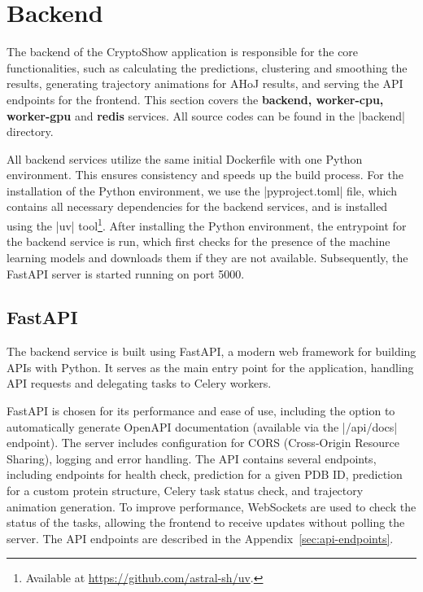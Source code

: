 \section{Backend}
\label{sec:backend}

The backend of the CryptoShow application is responsible for the core functionalities, such as calculating the predictions, clustering and smoothing the results, generating trajectory animations for AHoJ results, and serving the API endpoints for the frontend. This section covers the \textbf{backend, worker-cpu, worker-gpu} and \textbf{redis} services. All source codes can be found in the \inline|backend| directory.

All backend services utilize the same initial Dockerfile with one Python environment. This ensures consistency and speeds up the build process. For the installation of the Python environment, we use the \inline|pyproject.toml| file, which contains all necessary dependencies for the backend services, and is installed using the \inline|uv| tool\footnote{Available at \url{https://github.com/astral-sh/uv}.}. After installing the Python environment, the entrypoint for the backend service is run, which first checks for the presence of the machine learning models and downloads them if they are not available. Subsequently, the FastAPI server is started running on port 5000.

\subsection{FastAPI}
\label{sec:fastapi}

The backend service is built using FastAPI, a modern web framework for building APIs with Python. It serves as the main entry point for the application, handling API requests and delegating tasks to Celery workers.

FastAPI is chosen for its performance and ease of use, including the option to automatically generate OpenAPI documentation (available via the \inline|/api/docs| endpoint). The server includes configuration for CORS (Cross-Origin Resource Sharing), logging and error handling. The API contains several endpoints, including endpoints for health check, prediction for a given PDB ID, prediction for a custom protein structure, Celery task status check, and trajectory animation generation. To improve performance, WebSockets are used to check the status of the tasks, allowing the frontend to receive updates without polling the server. The API endpoints are described in the Appendix~\ref{sec:api-endpoints}.

